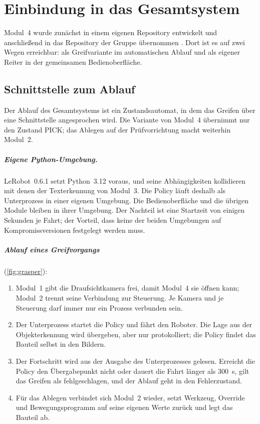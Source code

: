 \chapter{Einbindung in das Gesamtsystem}
\label{ch:integration}

Modul~4 wurde zunächst in einem eigenen Repository entwickelt und anschließend in das
Repository der Gruppe übernommen . Dort ist es auf zwei Wegen
erreichbar: als Greifvariante im automatischen Ablauf und als eigener Reiter in der
gemeinsamen Bedienoberfläche.

\section{Schnittstelle zum Ablauf}
\label{sec:grasper}

Der Ablauf des Gesamtsystems ist ein Zustandsautomat, in dem das Greifen über eine
Schnittstelle  angesprochen wird. Die Variante von Modul~4 übernimmt nur den
Zustand PICK; das Ablegen auf der Prüfvorrichtung macht weiterhin Modul~2.

\paragraph{Eigene Python-Umgebung.} LeRobot~0.6.1 setzt Python~3.12 voraus, und seine
Abhängigkeiten kollidieren mit denen der Texterkennung von Modul~3. Die Policy läuft deshalb
als Unterprozess in einer eigenen Umgebung. Die Bedienoberfläche und die übrigen Module
bleiben in ihrer Umgebung. Der Nachteil ist eine Startzeit von einigen Sekunden je Fahrt; der
Vorteil, dass keine der beiden Umgebungen auf Kompromissversionen festgelegt werden muss.

\paragraph{Ablauf eines Greifvorgangs} (\cref{fig:grasper}):
\begin{enumerate}
  \item Modul~1 gibt die Draufsichtkamera frei, damit Modul~4 sie öffnen kann; Modul~2 trennt
    seine Verbindung zur Steuerung. Je Kamera und je Steuerung darf immer nur ein Prozess
    verbunden sein.
  \item Der Unterprozess startet die Policy und fährt den Roboter. Die Lage aus der
    Objekterkennung wird übergeben, aber nur protokolliert; die Policy findet das Bauteil
    selbst in den Bildern.
  \item Der Fortschritt wird aus der Ausgabe des Unterprozesses gelesen. Erreicht die Policy
    den Übergabepunkt nicht oder dauert die Fahrt länger als \SI{300}{\second}, gilt das
    Greifen als fehlgeschlagen, und der Ablauf geht in den Fehlerzustand.
  \item Für das Ablegen verbindet sich Modul~2 wieder, setzt Werkzeug, Override und
    Bewegungsprogramm auf seine eigenen Werte zurück und legt das Bauteil ab.
\end{enumerate}

